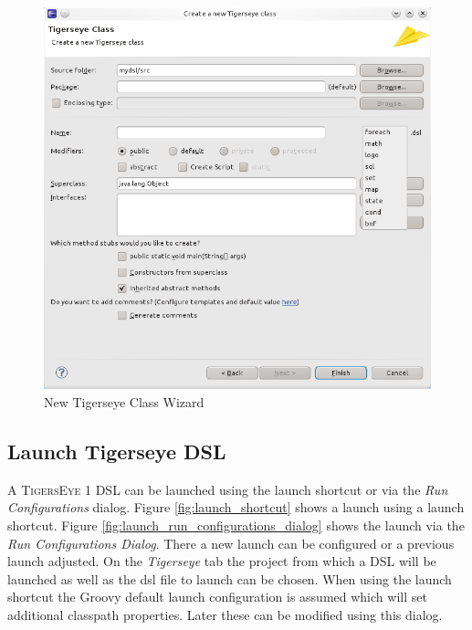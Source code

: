 \documentclass[article,colorback,accentcolor=tud4c]{tudreport}
\newcommand\tiger{%
  \textsc{TigersEye}
}
\begin{document}
	\begin{figure}
	  \centering
	  \includegraphics[scale=.5]{./pics/new_tigerseye_class_wizard.png}
	  \caption{New Tigerseye Class Wizard}
	  \label{fig:new_tiger_class_page}
	\end{figure}	
	
	
	\subsection{Launch Tigerseye DSL}
	  A \tiger1 DSL can be launched using the launch shortcut or via the \textit{Run Configurations} dialog. Figure \ref{fig:launch_shortcut} shows a launch using a launch shortcut. Figure  \ref{fig:launch_run_configurations_dialog} shows the launch via the \emph{Run Configurations Dialog}. There a new launch can be configured or a previous launch adjusted. On the \emph{Tigerseye} tab the project from which a DSL will be launched as well as the dsl file to launch can be chosen. When using the launch shortcut the Groovy default launch configuration is assumed which will set additional classpath properties. Later these can be modified using this dialog.
	
\end{document}
